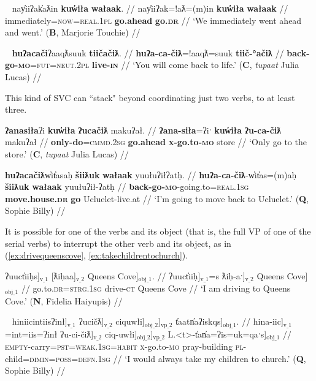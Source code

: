 \ex~ \label{ex:goaheadwent}
\begingl
\glpreamble nay̓iiʔak̓aƛin \textbf{kuw̓iła} \textbf{wałaak}. //
\gla nay̓iiʔak=!aƛ=(m)in \textbf{kuw̓iła} \textbf{wałaak} //
\glb immediately=\textsc{now}=\textsc{real.1pl} \textbf{go.ahead} \textbf{go.\textsc{dr}} //
\glft `We immediately went ahead and went.' (\textbf{B}, Marjorie Touchie) //
\endgl
\xe

\ex~ \label{ex:comebacktolife}
\begingl
\glpreamble \textbf{huʔacači}ʔaaqƛsuuk \textbf{tiičačiƛ}. //
\gla \textbf{huʔa-ca-čiƛ}=!aaqƛ=suuk \textbf{tiič-°ačiƛ} //
\glb \textbf{back-go-\textsc{mo}}=\textsc{fut}=\textsc{neut.2pl} \textbf{live-\textsc{in}} //
\glft `You will come back to life.' (\textbf{C}, \textit{tupaat} Julia Lucas) //
\endgl
\xe

This kind of SVC can ``stack" beyond coordinating just two verbs, to at least three.

\ex \label{ex:onlygotostore}
\begingl
\glpreamble \textbf{ʔanasiła}ʔi \textbf{kuw̓iła} \textbf{ʔucačiƛ} makuʔał. //
\gla \textbf{ʔana-siła}=ʔiˑ \textbf{kuw̓iła} \textbf{ʔu-ca-čiƛ} makuʔał //
\glb \textbf{only-do}=\textsc{cmmd.2sg} \textbf{go.ahead} \textbf{\textsc{x}-go.to-\textsc{mo}} store //
\glft `Only go to the store.' (\textbf{C}, \textit{tupaat} Julia Lucas) //
\endgl
\xe

\ex \label{ex:movebackucluelet}
\begingl
\glpreamble \textbf{huʔacačiƛ}w̓it̓asaḥ \textbf{šiiƛuk} \textbf{wałaak} yuułuʔiłʔatḥ. //
\gla \textbf{huʔa-ca-čiƛ}-w̓it̓as=(m)aḥ \textbf{šiiƛuk} \textbf{wałaak} yuułuʔił-ʔatḥ //
\glb \textbf{back-go-\textsc{mo}}-going.to=\textsc{real.1sg} \textbf{move.house.\textsc{dr}} \textbf{go} Ucluelet-live.at //
\glft `I'm going to move back to Ucluelet.' (\textbf{Q}, Sophie Billy) //
\endgl
\xe

It is possible for one of the verbs and its object (that is, the full VP of one of the serial verbs) to interrupt the other verb and its object, as in (\ref{ex:drivequeenscove}, \ref{ex:takechildrentochurch}).

\ex \label{ex:drivequeenscove}
\begingl
\glpreamble ʔuuct̓iiḥs]$_{\text{v\_1}}$ [ƛiḥaa]$_{\text{v\_2}}$ Queens Cove]$_{\text{obj\_1}}$. //
\gla ʔuuct̓iiḥ]$_{\text{v\_1}}$=s ƛiḥ-aˑ]$_{\text{v\_2}}$ Queens Cove]$_{\text{obj\_1}}$ //
\glb go.to.\textsc{dr}=\textsc{strg.1sg} drive-\textsc{ct} Queens Cove //
\glft `I am driving to Queens Cove.' (\textbf{N}, Fidelia Haiyupis) //
\endgl
\xe

\ex~ \label{ex:takechildrentochurch}
\begingl
\glpreamble hiniicintiisʔinł]$_{\text{v\_1}}$ ʔucičƛ]$_{\text{v\_2}}$ ciquwłi]$_{\text{obj\_2}}$]$_{\text{vp\_2}}$ t̓aatn̓aʔiskqs]$_{\text{obj\_1}}$. //
\gla hina-iic]$_{\text{v\_1}}$=int=iis=ʔinł ʔu-ci-čiƛ]$_{\text{v\_2}}$ ciq-uwłi]$_{\text{obj\_2}}$]$_{\text{vp\_2}}$ L.<t>-t̓an̓a=ʔis=uk=qaˑs]$_{\text{obj\_1}}$  //
\glb \textsc{empty}-carry=\textsc{pst}=\textsc{weak.1sg}=\textsc{habit} \textsc{x}-go.to-\textsc{mo} pray-building \textsc{pl}-child=\textsc{dimin}=\textsc{poss}=\textsc{defn.1sg} //
\glft `I would always take my children to church.' (\textbf{Q}, Sophie Billy) //
\endgl
\xe

